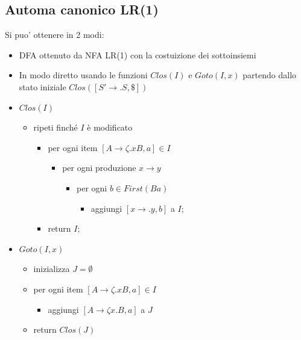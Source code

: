\documentclass[a4paper,12pt]{article}
\begin{document}
{\subsection{Automa canonico LR(1)}
Si puo' ottenere in 2 modi:
\begin{itemize}
  \item DFA ottenuto da NFA LR(1) con la costuizione dei sottoinsiemi
  \item In modo diretto usando le funzioni $Clos(I)$ e $Goto(I,x)$ partendo dallo stato iniziale $Clos([S' \to .S, \mathdollar])$
\end{itemize}
\vspace{5px}
\begin{itemize}
  \item $Clos(I)$
  \begin{itemize}
    \item ripeti finché $I$ è modificato
    \begin{itemize}
      \item per ogni item $[A \to \zeta . xB,a] \in I$
      \begin{itemize}
        \item per ogni produzione $x \to y$
        \begin{itemize}
          \item per ogni $b \in First(Ba)$
          \begin{itemize}
            \item aggiungi $[x \to .y, b]$ a $I$;
          \end{itemize}
        \end{itemize}
      \end{itemize}
      \item return $I$;
    \end{itemize}
  \end{itemize}
\end{itemize}
\vspace{1em}
\begin{itemize}
  \item $Goto(I,x)$
  \begin{itemize}
    \item inizializza $J = \emptyset$
    \item per ogni item $[A \to \zeta . xB, a] \in I$
    \begin{itemize}
      \item aggiungi $[A \to \zeta x . B, a]$ a $J$
    \end{itemize}
    \item return $Clos(J)$

\end{itemize}
\end{itemize}}
\end{document}
